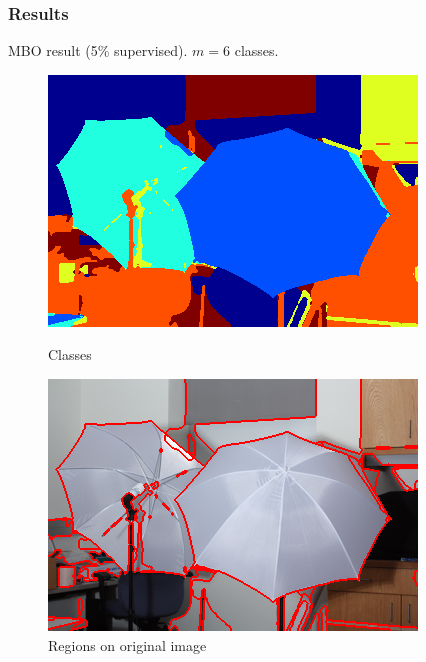 \documentclass{beamer}
\begin{document}
\begin{frame}
  \frametitle{Results}
  MBO result (5\% supervised). $m = 6$ classes.
  \begin{figure}[ht]
    \begin{minipage}[b]{0.45\linewidth}
      \centering
      \includegraphics[width=\textwidth]{./Images/Umbrella/MBO/classification.png}
      \caption{Classes}
    \end{minipage}
    \begin{minipage}[b]{0.45\linewidth}
      \centering
      \includegraphics[width=\textwidth]{./Images/Umbrella/MBO/imWithBorders.png}
      \caption{Regions on original image}
    \end{minipage}
  \end{figure}
\end{frame}
\end{document}
